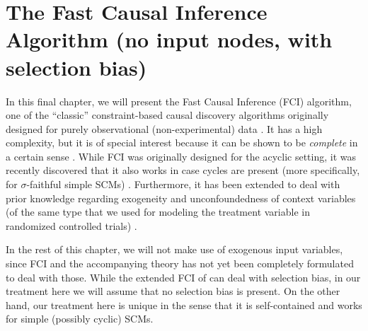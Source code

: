 \section{The Fast Causal Inference Algorithm (no input nodes, with selection bias)}\label{sec:fci}


In this final chapter, we will present the Fast Causal Inference (FCI)
algorithm, one of the ``classic'' constraint-based causal discovery algorithms
originally designed for purely observational (non-experimental) data \cite{SMR1995,SMR1999}.
It has a high complexity, but it is of special interest because
it can be shown to be \emph{complete} in a certain sense \cite{Zhang2008_AI}. 
While FCI was originally designed for
the acyclic setting, it was recently discovered that it also works in case cycles
are present (more specifically, for $\sigma$-faithful simple SCMs) \cite{MooijClaassen_UAI_20}.
Furthermore, it has been extended
to deal with prior knowledge regarding exogeneity and unconfoundedness of context
variables (of the same type that we used for modeling the treatment variable in
randomized controlled trials) \cite{Mooij++_JMLR_20}.

In the rest of this chapter, we will not make use of exogenous input variables, since FCI and the accompanying theory has not yet been completely formulated to deal with those.
While the extended FCI of \cite{SMR1999} can deal with selection bias, in our treatment here we will assume that no selection bias is present.
On the other hand, our treatment here is unique in the sense that it is self-contained and works for simple (possibly cyclic) SCMs.



